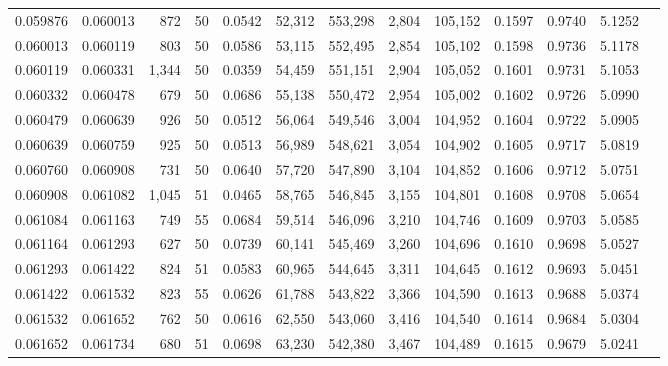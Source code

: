 \begin{tabular}{rrrrrrrrrrrrr}
0.059876 & 0.060013 &   872 &  50 &                                     0.0542 &  52,312 & 553,298 &   2,804 & 105,152 & 0.1597 & 0.9740 & 5.1252 \\
0.060013 & 0.060119 &   803 &  50 &                                     0.0586 &  53,115 & 552,495 &   2,854 & 105,102 & 0.1598 & 0.9736 & 5.1178 \\
0.060119 & 0.060331 & 1,344 &  50 &                                     0.0359 &  54,459 & 551,151 &   2,904 & 105,052 & 0.1601 & 0.9731 & 5.1053 \\
0.060332 & 0.060478 &   679 &  50 &                                     0.0686 &  55,138 & 550,472 &   2,954 & 105,002 & 0.1602 & 0.9726 & 5.0990 \\
0.060479 & 0.060639 &   926 &  50 &                                     0.0512 &  56,064 & 549,546 &   3,004 & 104,952 & 0.1604 & 0.9722 & 5.0905 \\
0.060639 & 0.060759 &   925 &  50 &                                     0.0513 &  56,989 & 548,621 &   3,054 & 104,902 & 0.1605 & 0.9717 & 5.0819 \\
0.060760 & 0.060908 &   731 &  50 &                                     0.0640 &  57,720 & 547,890 &   3,104 & 104,852 & 0.1606 & 0.9712 & 5.0751 \\
0.060908 & 0.061082 & 1,045 &  51 &                                     0.0465 &  58,765 & 546,845 &   3,155 & 104,801 & 0.1608 & 0.9708 & 5.0654 \\
0.061084 & 0.061163 &   749 &  55 &                                     0.0684 &  59,514 & 546,096 &   3,210 & 104,746 & 0.1609 & 0.9703 & 5.0585 \\
0.061164 & 0.061293 &   627 &  50 &                                     0.0739 &  60,141 & 545,469 &   3,260 & 104,696 & 0.1610 & 0.9698 & 5.0527 \\
0.061293 & 0.061422 &   824 &  51 &                                     0.0583 &  60,965 & 544,645 &   3,311 & 104,645 & 0.1612 & 0.9693 & 5.0451 \\
0.061422 & 0.061532 &   823 &  55 &                                     0.0626 &  61,788 & 543,822 &   3,366 & 104,590 & 0.1613 & 0.9688 & 5.0374 \\
0.061532 & 0.061652 &   762 &  50 &                                     0.0616 &  62,550 & 543,060 &   3,416 & 104,540 & 0.1614 & 0.9684 & 5.0304 \\
0.061652 & 0.061734 &   680 &  51 &                                     0.0698 &  63,230 & 542,380 &   3,467 & 104,489 & 0.1615 & 0.9679 & 5.0241 \\

\end{tabular}
